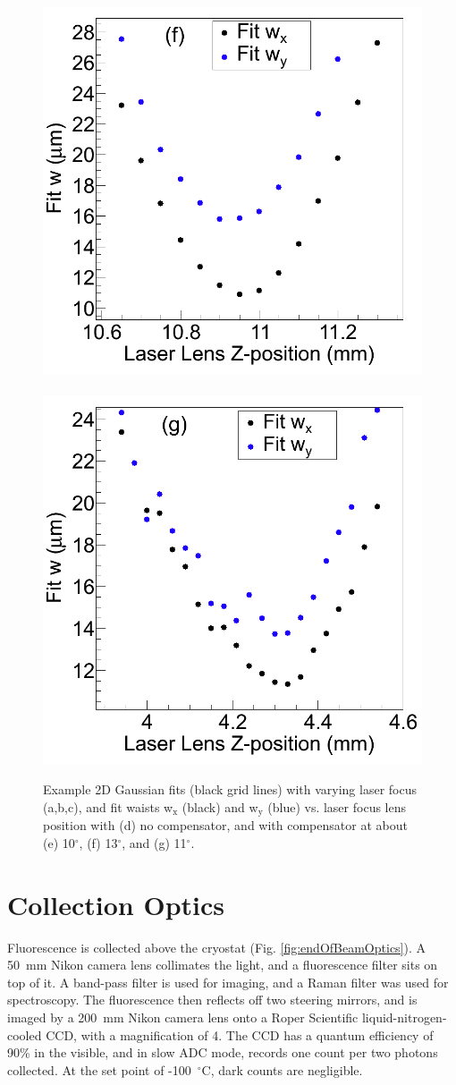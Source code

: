 \begin{figure}
                \includegraphics[width=.45\textwidth]{figures/astigcorr_curve_corr_13deg.png}
                ~
                \includegraphics[width=.45\textwidth]{figures/astigcorr_curve_corr_9-16.png}
                \caption{Example 2D Gaussian fits (black grid lines) with varying laser focus (a,b,c), and fit waists  w$_{\text{x}}$ (black) and  w$_{\text{y}}$ (blue) vs. laser focus lens position with (d) no compensator, and with compensator at about (e) 10$^{\circ}$, (f) 13$^{\circ}$, and (g) 11$^{\circ}$.}
\label{fig:astig}
\end{figure}



\section{Collection Optics}
\label{sec:collection}

Fluorescence is collected above the cryostat (Fig. \ref{fig:endOfBeamOptics}).  A 50~mm Nikon camera lens collimates the light, and a fluorescence filter sits on top of it.  A band-pass filter is used for imaging, and a Raman filter was used for spectroscopy.  The fluorescence then reflects off two steering mirrors, and is imaged by a 200~mm Nikon camera lens onto a Roper Scientific liquid-nitrogen-cooled CCD, with a magnification of 4.  The CCD has a quantum efficiency of 90\% in the visible, and in slow ADC mode, records one count per two photons collected.  At the set point of -100~$^{\circ}$C, dark counts are negligible.


